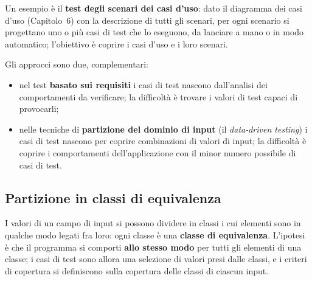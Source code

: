 Un esempio è il \textbf{test degli scenari dei casi d'uso}: dato il diagramma dei casi d'uso (Capitolo~6) con la
descrizione di tutti gli scenari, per ogni scenario si progettano uno o più casi di test che lo eseguono, da lanciare a
mano o in modo automatico; l'obiettivo è coprire i casi d'uso e i loro scenari.

Gli approcci sono due, complementari:

\begin{itemize}
  \item nel test \textbf{basato sui requisiti} i casi di test nascono dall'analisi dei comportamenti da verificare; la
        difficoltà è trovare i valori di test capaci di provocarli;
  \item nelle tecniche di \textbf{partizione del dominio di input} (il \textit{data-driven testing}) i casi di test
        nascono per coprire combinazioni di valori di input; la difficoltà è coprire i comportamenti
        dell'applicazione con il minor numero possibile di casi di test.
\end{itemize}

\subsection{Partizione in classi di equivalenza}

I valori di un campo di input si possono dividere in classi i cui elementi sono in qualche modo legati fra loro: ogni
classe è una \textbf{classe di equivalenza}. L'ipotesi è che il programma si comporti \textbf{allo stesso modo} per tutti
gli elementi di una classe; i casi di test sono allora una selezione di valori presi dalle classi, e i criteri di
copertura si definiscono sulla copertura delle classi di ciascun input.


\begin{center}
\end{center}

